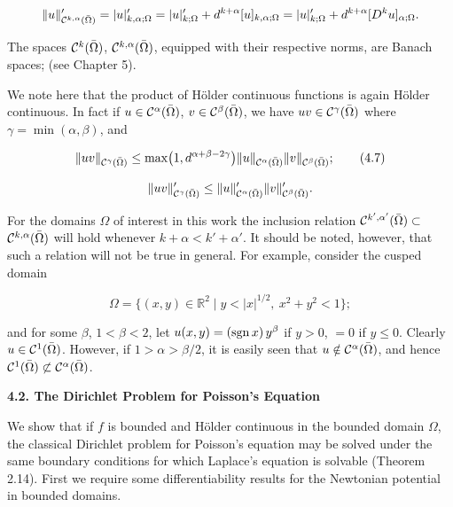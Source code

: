 \begin{definition}
\begin{equation}
\|u\|'_{\mathcal{C}^{k,\alpha}(\bar{\Omega})} = |u|'_{k,\alpha;\Omega} = |u|'_{k;\Omega} + d^{k+\alpha}[u]_{k,\alpha;\Omega}
= |u|'_{k;\Omega} + d^{k+\alpha}[D^k u]_{\alpha;\Omega}.
\end{equation}

\noindent The spaces $\mathcal{C}^k(\bar{\Omega})$, $\mathcal{C}^{k,\alpha}(\bar{\Omega})$, equipped with their respective norms, are Banach
spaces; (see Chapter 5).

\noindent We note here that the product of Hölder continuous functions is again Hölder
continuous. In fact if $u \in \mathcal{C}^\alpha(\bar{\Omega})$, $v \in \mathcal{C}^\beta(\bar{\Omega})$, we have $uv \in \mathcal{C}^\gamma(\bar{\Omega})$ where $\gamma = \min(\alpha,\beta)$,
and

\begin{equation}
\|uv\|_{\mathcal{C}^\gamma(\bar{\Omega})} \le \max\bigl(1, d^{\alpha+\beta-2\gamma}\bigr)\|u\|_{\mathcal{C}^\alpha(\bar{\Omega})}\|v\|_{\mathcal{C}^\beta(\bar{\Omega})};
\tag{4.7}
\end{equation}

\begin{equation}
\|uv\|'_{\mathcal{C}^\gamma(\bar{\Omega})} \le \|u\|'_{\mathcal{C}^\alpha(\bar{\Omega})}\|v\|'_{\mathcal{C}^\beta(\bar{\Omega})}.
\end{equation}

\noindent For the domains $\Omega$ of interest in this work the inclusion relation $\mathcal{C}^{k',\alpha'}(\bar{\Omega}) \subset$
$\mathcal{C}^{k,\alpha}(\bar{\Omega})$ will hold whenever $k+\alpha < k' + \alpha'$. It should be noted, however, that such a
relation will not be true in general. For example, consider the cusped domain

\[
\Omega = \{(x,y) \in \mathbb{R}^2 \mid y < |x|^{1/2}, \ x^2 + y^2 < 1\};
\]

\noindent and for some $\beta$, $1 < \beta < 2$, let $u(x,y) = (\operatorname{sgn} x)\, y^\beta$ if $y > 0$, $= 0$ if $y \le 0$. Clearly
$u \in \mathcal{C}^1(\bar{\Omega})$. However, if $1 > \alpha > \beta/2$, it is easily seen that $u \notin \mathcal{C}^\alpha(\bar{\Omega})$, and hence
$\mathcal{C}^1(\bar{\Omega}) \not\subset \mathcal{C}^\alpha(\bar{\Omega})$.
\end{definition}


\begin{center}
\textbf{4.2. The Dirichlet Problem for Poisson's Equation}
\end{center}

\noindent We show that if $f$ is bounded and Hölder continuous in the bounded domain $\Omega$, the classical Dirichlet problem for Poisson's equation may be solved under the same boundary conditions for which Laplace's equation is solvable (Theorem 2.14). First we require some differentiability results for the Newtonian potential in bounded domains.

